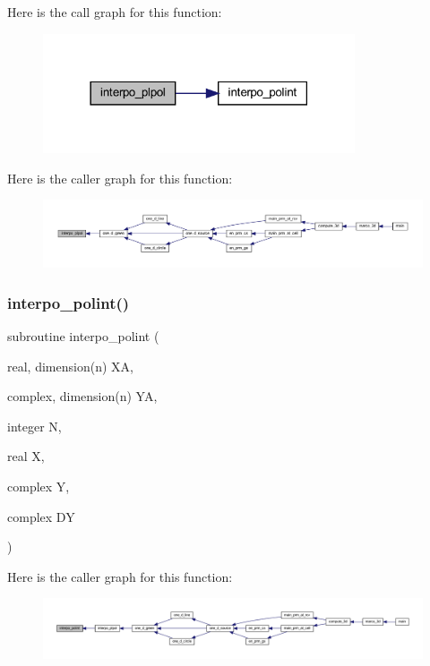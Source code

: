 Here is the call graph for this function\+:
\nopagebreak
\begin{figure}[H]
\begin{center}
\leavevmode
\includegraphics[width=261pt]{Marco_8f90_afd0f4c3b7f02fba61d9bd11b3a142ac2_cgraph}
\end{center}
\end{figure}
Here is the caller graph for this function\+:
\nopagebreak
\begin{figure}[H]
\begin{center}
\leavevmode
\includegraphics[width=350pt]{Marco_8f90_afd0f4c3b7f02fba61d9bd11b3a142ac2_icgraph}
\end{center}
\end{figure}
\mbox{\label{Marco_8f90_aadd0426cc10854791039735bfa14140d}} 
\subsubsection{\texorpdfstring{interpo\+\_\+polint()}{interpo\_polint()}}
{\footnotesize\ttfamily subroutine interpo\+\_\+polint (\begin{DoxyParamCaption}\item[{real, dimension(n)}]{XA,  }\item[{complex, dimension(n)}]{YA,  }\item[{integer}]{N,  }\item[{real}]{X,  }\item[{complex}]{Y,  }\item[{complex}]{DY }\end{DoxyParamCaption})}

Here is the caller graph for this function\+:
\nopagebreak
\begin{figure}[H]
\begin{center}
\leavevmode
\includegraphics[width=350pt]{Marco_8f90_aadd0426cc10854791039735bfa14140d_icgraph}
\end{center}
\end{figure}
\mbox{\label{Marco_8f90_ab3d44a77ee1868f9a09dcac7e6bfcdce}} 
